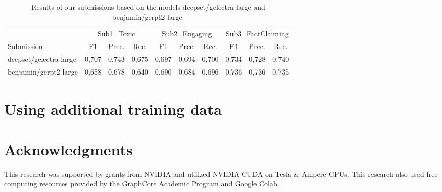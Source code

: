 \documentclass[11pt,a4paper]{article}
\begin{document}
\begin{table*}[t]
  \begin{tabular}{lrrrrrrrrr}
    & \multicolumn{3}{c}{Sub1\_Toxic} & \multicolumn{3}{c}{Sub2\_Engaging} & \multicolumn{3}{c}{Sub3\_FactClaiming} \\ 
    Submission & \multicolumn{1}{c}{F1} & \multicolumn{1}{c}{Prec.} & \multicolumn{1}{c}{Rec.} & 
                 \multicolumn{1}{c}{F1} & \multicolumn{1}{c}{Prec.} & \multicolumn{1}{c}{Rec.} & 
                 \multicolumn{1}{c}{F1} & \multicolumn{1}{c}{Prec.} & \multicolumn{1}{c}{Rec.} \\
    \hline
    deepset/gelectra-large & 0,707 & 0,743 & 0,675 & 0,697 & 0,694 & 0,700 & 0,734 & 0,728 & 0,740 \\
    benjamin/gerpt2-large & 0,658 & 0,678 & 0,640 & 0,690 & 0,684 & 0,696 & 0,736 & 0,736 & 0,735
  \end{tabular}
  \label{tab:results}
  \caption{Results of our submissions based on the models deepset/gelectra-large and benjamin/gerpt2-large.}
\end{table*}

\section{Using additional training data}

\section*{Acknowledgments}
This research was supported by grants from NVIDIA and utilized NVIDIA CUDA on Tesla \& Ampere GPUs.
This research also used free computing resources provided by the GraphCore Academic Program and Google Colab.




\end{document}
